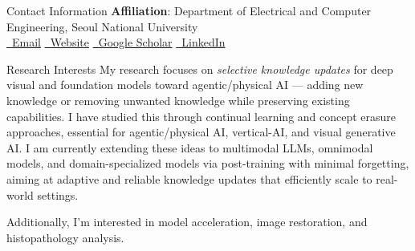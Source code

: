 \documentclass{resume} %
\begin{document}
\begin{rSection}{Contact Information}
{\bf Affiliation}: Department of Electrical and Computer Engineering, Seoul National University \\[5pt]
\href{mailto:ldlqudgus756@snu.ac.kr}{\faEnvelope[regular]~Email}\hspace{1.4em}
\href{https://hyun1a.github.io}{\faGlobe~Website}\hspace{1.4em}
\href{https://scholar.google.com/citations?user=4bKcyukAAAAJ&hl=en}{~Google Scholar}\hspace{1.4em}
\href{https://www.linkedin.com/in/bh-lee}{\faLinkedin~LinkedIn} \\
\end{rSection}


\begin{rSection}{Research Interests}
My research focuses on \emph{selective knowledge updates} for deep visual and foundation models toward agentic/physical AI --- adding new knowledge or removing unwanted knowledge while preserving existing capabilities.
I have studied this through continual learning and concept erasure approaches, 
essential for agentic/physical AI, vertical-AI, and visual generative AI.
I am currently extending these ideas to multimodal LLMs, omnimodal models, and domain-specialized models
via post-training with minimal forgetting, aiming at adaptive and reliable knowledge updates that efficiently scale to real-world settings.


Additionally, I’m interested in model acceleration, image restoration, and histopathology analysis. \\
\end{rSection}
\end{document}
